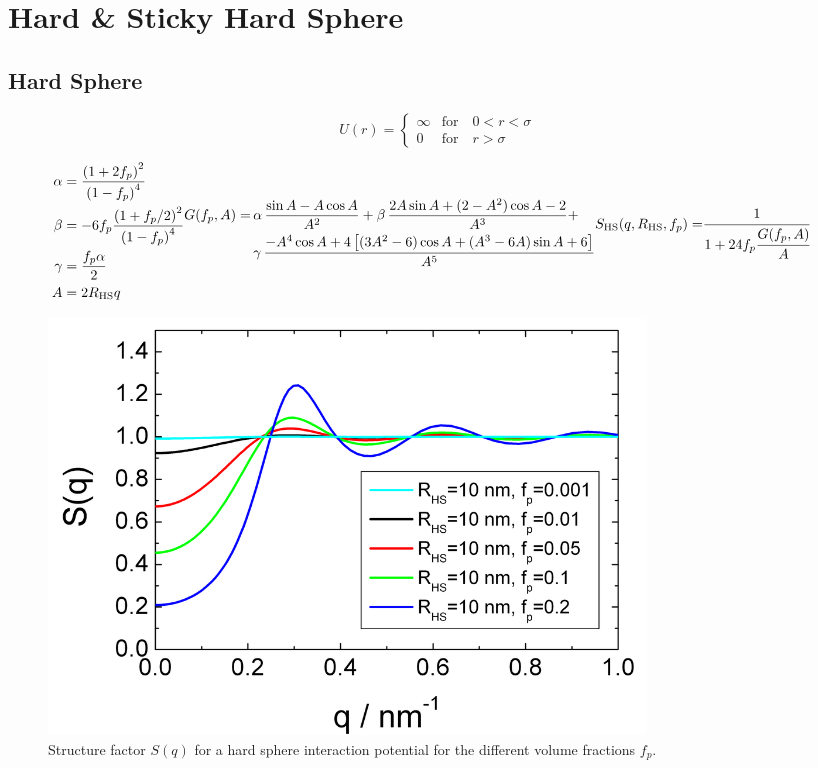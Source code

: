 \clearpage
\section{Hard \& Sticky Hard Sphere}
\subsection{Hard Sphere} \cite{Percus1958,Vrij1979}

\begin{equation}
U(r) =
 \begin{cases}
      \infty    & \text{for} \quad 0<r<\sigma \\
      0         & \text{for} \quad r>\sigma
   \end{cases}
\end{equation}

\begin{subequations}
\begin{align}
\alpha &= \frac{\left(1+2f_p\right)^2}{\left(1-f_p\right)^4} \\
\beta  &= -6 f_p \frac{\left(1 +f_p/2 \right)^2}{\left(1-f_p\right)^4} \\
\gamma &= \frac{f_p \alpha}{2}  \\
A &= 2 R_\text{HS} q
\end{align}

\begin{align}
G(f_p,A) =  & \, \alpha \, \frac{\sin A -A \cos A }{A^2} + \beta \, \frac{2 A \sin A +(2-A^2) \cos A -2}{A^3} + \nonumber \\
    & \, \gamma  \, \frac{-A^4 \cos A + 4\left[(3A^2-6)\cos A+(A^3-6A)\sin A+6\right]}{A^5}
\end{align}
\begin{align}
S_\text{HS}(q,R_\text{HS},f_p)  = & \cfrac{1}{1+24 f_p
\cfrac{G(f_p,A)}{A}}
\end{align}
\end{subequations}


\begin{figure}[htb]
\begin{center}
\includegraphics[width=0.768\textwidth]{../images/structure_factor/HardSphere/HardSphereSQ.png}
\end{center}
\caption{Structure factor $S(q)$ for a hard sphere interaction potential for the different volume fractions $f_p$.}
\label{fig:SQHardSphere}
\end{figure}


